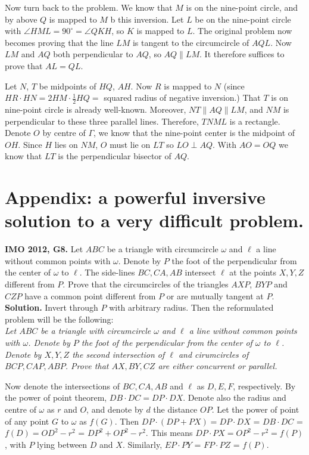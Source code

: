 \documentclass[11pt,a4paper]{article}
\begin{document}
\begin{enumerate}
Now turn back to the problem. We know that $M$ is on the nine-point circle, and by above $Q$ is mapped to $M$ b this inversion.  Let $L$ be on the nine-point circle with $\angle HML = 90^{\circ}=\angle QKH$, so $K$ is mapped to $L$. The original problem now becomes proving that the line $LM$ is tangent to the circumcircle of $AQL$. Now $LM$ and $AQ$ both perpendicular to $AQ$, so $AQ\parallel LM$. It therefore suffices to prove that $AL=QL$.

 Let $N$, $T$ be midpoints of $HQ$, $AH$. Now $R$ is mapped to $N$ (since $HR\cdot HN=2HM\cdot \frac12 HQ=$ squared radius of negative inversion.) That $T$ is on nine-point circle is already well-known. Moreover, $NT\parallel AQ\parallel LM$, and $NM$ is perpendicular to these three parallel lines. Therefore, $TNML$ is a rectangle. Denote $O$ by centre of $\Gamma$, we know that the nine-point center is the midpoint of $OH$. Since $H$ lies on $NM$, $O$ must lie on $LT$ so $LO\perp AQ.$ With $AO=OQ$ we know that $LT$ is the perpendicular bisector of $AQ$.


\end{enumerate}

\newpage

\section {Appendix: a powerful inversive solution to a very difficult problem.}

\textbf {IMO 2012, G8.} Let $ABC$ be a triangle with circumcircle $\omega$ and $\ell$ a line without common points with $\omega$. Denote by $P$ the foot of the perpendicular from the center of $\omega$ to $\ell$. The side-lines $BC,CA,AB$ intersect $\ell$ at the points $X,Y,Z$ different from $P$. Prove that the circumcircles of the triangles $AXP$, $BYP$ and $CZP$ have a common point different from $P$ or are mutually tangent at $P$.\\
\textbf {Solution.} Invert through $P$ with arbitrary radius. Then the reformulated problem will be the following:\\
\emph {Let $ABC$ be a triangle with circumcircle $\omega$ and $\ell$ a line without common points with $\omega$. Denote by $P$ the foot of the perpendicular from the center of $\omega$ to $\ell$. Denote by $X, Y, Z$ the second intersection of $\ell$ and cirumcircles of $BCP, CAP, ABP$. Prove that $AX, BY, CZ$ are either concurrent or parallel.}

Now denote the intersections of $BC, CA, AB$ and $\ell$ as $D, E, F$, respectively. By the power of point theorem, $DB\cdot DC=DP\cdot DX$. Denote also the radius and centre of $\omega$ as $r$ and $O$, and denote by $d$ the distance $OP$. Let the power of point of any point $G$ to $\omega$ as $f(G)$. Then $DP\cdot (DP+PX) = DP\cdot DX$ = $DB\cdot DC$ = $f(D)=OD^2-r^2$ = $DP^2+OP^2-r^2$. This means $DP\cdot PX=OP^2-r^2=f(P)$, with $P$ lying between $D$ and $X$. Similarly, $EP\cdot PY$ = $FP\cdot PZ$ = $f(P)$.
\end{document}
